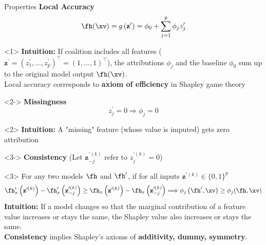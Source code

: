 \documentclass[10pt,compress,t,notes=noshow, xcolor=table]{beamer}
\begin{document}



\begin{framev}[align=top]{Properties}
\textbf{Local Accuracy}
$$
\fh(\xv)=g\left(\mathbf{z}^{\prime}\right)=\phi_{0}+\sum_{j=1}^{p} \phi_{j} z_{j}^{\prime}
$$
\begin{onlyenv}<1>
\textbf{Intuition:} If coalition includes all features ($\mathbf{z}^{\prime} = (z^{\prime}_1, \dots, z^{\prime}_p)^\top = (1, \dots, 1)^\top$), the attributions $\phi_j$ and the baseline $\phi_0$ sum up to the original model output $\fh(\xv)$.\\
\spacer[0.25]
Local accuracy corresponds to \textbf{axiom of efficiency} in Shapley game theory
\end{onlyenv}
\begin{onlyenv}<2->
\textbf{Missingness}
$$
z_{j}^{\prime}=0 \Longrightarrow \phi_{j}=0
$$
\end{onlyenv}
\begin{onlyenv}<2>
\textbf{Intuition:} A "missing" feature (whose value is imputed) gets zero attribution
\end{onlyenv}
\begin{onlyenv}<3->
\textbf{Consistency} (Let $\mathbf{z}^{\prime (k)}_{-j} \text{ refer to } z_{j}^{\prime (k)}=0$) \\
\end{onlyenv}
\begin{onlyenv}<3>
For any two models $\fh$ and $\fh^{\prime}$, if for all inputs $\mathbf{z}^{\prime (k)} \in \{0, 1\}^p$
$$
\fh_{x}^{\prime}\left(\mathbf{z}^{\prime (k)}\right)-\fh_{x}^{\prime}\left(\mathbf{z}^{\prime (k)}_{-j}\right) \geq \fh_{x}\left(\mathbf{z}^{\prime (k)}\right)-\fh_{x}\left(\mathbf{z}^{\prime (k)} _{-j}\right) \Longrightarrow \phi_{j}\left(\fh^{\prime}, \xv\right) \geq \phi_{j}(\fh, \xv)
$$
\textbf{Intuition:} If a model changes so that the marginal contribution of a feature value increases or stays the same, the Shapley value also increases or stays the same.\\
\spacer[0.25]
\textbf{Consistency} implies Shapley’s axioms of \textbf{additivity, dummy, symmetry}.
\end{onlyenv}
\end{framev}

\endlecture
\end{document}
